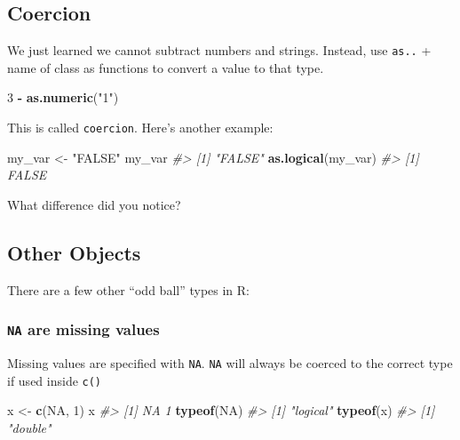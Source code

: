 \documentclass[]{book}
\newenvironment{Shaded}{\begin{snugshade}}{\end{snugshade}}
\newcommand{\CommentTok}[1]{\textcolor[rgb]{0.56,0.35,0.01}{\textit{#1}}}
\newcommand{\DecValTok}[1]{\textcolor[rgb]{0.00,0.00,0.81}{#1}}
\newcommand{\KeywordTok}[1]{\textcolor[rgb]{0.13,0.29,0.53}{\textbf{#1}}}
\newcommand{\NormalTok}[1]{#1}
\newcommand{\OperatorTok}[1]{\textcolor[rgb]{0.81,0.36,0.00}{\textbf{#1}}}
\newcommand{\OtherTok}[1]{\textcolor[rgb]{0.56,0.35,0.01}{#1}}
\newcommand{\StringTok}[1]{\textcolor[rgb]{0.31,0.60,0.02}{#1}}
\begin{document}
\hypertarget{coercion}{%
\subsection{Coercion}\label{coercion}}

We just learned we cannot subtract numbers and strings. Instead, use \texttt{as..} + name of class as functions to convert a value to that type.

\begin{Shaded}
\begin{Highlighting}[]
\DecValTok{3} \OperatorTok{-}\StringTok{ }\KeywordTok{as.numeric}\NormalTok{(}\StringTok{"1"}\NormalTok{)}
\end{Highlighting}
\end{Shaded}

This is called \texttt{coercion}. Here's another example:

\begin{Shaded}
\begin{Highlighting}[]
\NormalTok{my_var <-}\StringTok{ "FALSE"}
\NormalTok{my_var}
\CommentTok{#> [1] "FALSE"}
\KeywordTok{as.logical}\NormalTok{(my_var)}
\CommentTok{#> [1] FALSE}
\end{Highlighting}
\end{Shaded}

What difference did you notice?

\hypertarget{other-objects}{%
\subsection{Other Objects}\label{other-objects}}

There are a few other ``odd ball'' types in R:

\hypertarget{na-are-missing-values}{%
\subsubsection*{\texorpdfstring{\texttt{NA} are missing values}{NA are missing values}}\label{na-are-missing-values}}

Missing values are specified with \texttt{NA}. \texttt{NA} will always be coerced to the correct type if used inside \texttt{c()}

\begin{Shaded}
\begin{Highlighting}[]
\NormalTok{x <-}\StringTok{ }\KeywordTok{c}\NormalTok{(}\OtherTok{NA}\NormalTok{, }\DecValTok{1}\NormalTok{)}
\NormalTok{x}
\CommentTok{#> [1] NA  1}
\KeywordTok{typeof}\NormalTok{(}\OtherTok{NA}\NormalTok{)}
\CommentTok{#> [1] "logical"}
\KeywordTok{typeof}\NormalTok{(x)}
\CommentTok{#> [1] "double"}
\end{Highlighting}
\end{Shaded}
\end{document}
